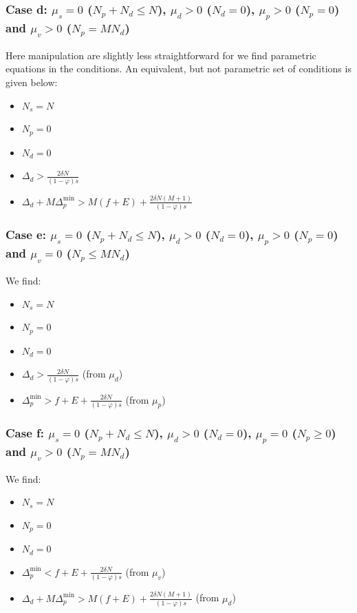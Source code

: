 \documentclass[english, a4paper]{article}
\theoremstyle{plain}
\theoremstyle{definition}
\theoremstyle{remark}
\begin{document}
    \subsubsection{Case d: $\mu_s = 0$ ($N_p + N_d \leq N$), $\mu_d > 0$ ($N_d = 0$), $\mu_p > 0$ ($N_p = 0$) and $\mu_v > 0$ ($N_p = MN_d$)}

    Here manipulation are slightly less straightforward for we find parametric equations in the conditions. An equivalent, but not parametric set of conditions is given below:

    \begin{itemize}
        \item $N_s = N$
        \item $N_p = 0$
        \item $N_d = 0$
        \item $\Delta_d > \frac{2\delta N }{(1 - \varphi)s}$
        \item $\Delta_d + M \Delta_p^{\text{min}} > M(f+ E) + \frac{2\delta N (M+1)}{(1 - \varphi) s}$
    \end{itemize}

    \subsubsection{Case e: $\mu_s = 0$ ($N_p + N_d \leq N$), $\mu_d > 0$ ($N_d = 0$), $\mu_p > 0$ ($N_p = 0$) and $\mu_v = 0$ ($N_p \leq MN_d$)}

    We find:

    \begin{itemize}
        \item $N_s = N$
        \item $N_p = 0$
        \item $N_d = 0$
        \item $\Delta_d > \frac{2\delta N }{(1 - \varphi)s}$ (from $\mu_d$)
        \item $\Delta_p^{\text{min}} > f+ E + \frac{2\delta N}{(1 - \varphi) s}$ (from $\mu_p$)
    \end{itemize}

    \subsubsection{Case f: $\mu_s = 0$ ($N_p + N_d \leq N$), $\mu_d > 0$ ($N_d = 0$), $\mu_p = 0$ ($N_p \geq 0$) and $\mu_v > 0$ ($N_p = MN_d$)}

    We find:

    \begin{itemize}
        \item $N_s = N$
        \item $N_p = 0$
        \item $N_d = 0$
        \item $\Delta_p^{\text{min}} < f+ E + \frac{2\delta N}{(1 - \varphi) s}$ (from $\mu_v$)
        \item $\Delta_d + M \Delta_p^{\text{min}} > M(f+ E) + \frac{2\delta N (M+1)}{(1 - \varphi) s}$ (from $\mu_d$)
    \end{itemize}
\end{document}

